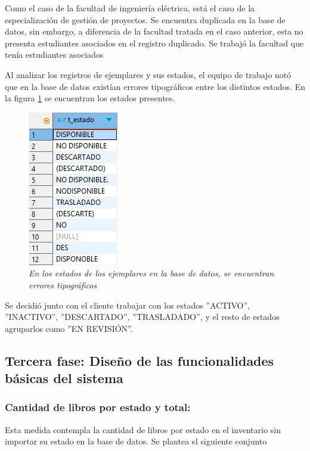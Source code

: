\documentclass[spanish]{ieee_upb}
\begin{document}
\vspace{0.3cm}
Como el caso de la facultad de ingeniería eléctrica, está el caso de la especialización de gestión de proyectos. Se encuentra duplicada en la base de datos, sin embargo, a diferencia de la facultad tratada en el caso anterior, esta no presenta estudiantes asociados en el registro duplicado. Se trabajó la facultad que tenía estudiantes asociados

\vspace{0.3cm}
Al analizar los registros de ejemplares y sus estados, el equipo de trabajo notó que en la base de datos existían errores tipográficos entre los distintos estados. En la figura \ref{fig:problemas-2} se encuentran los estados presentes.

 \begin{figure}[H] 
	\centering
	\includegraphics[width=0.2\linewidth]{img/variedades/bd-problemas2.png}
	\vspace{-1mm}
	\caption[Caso 2: Errores tipográficos en la base de datos]{\textit{En los estados de los ejemplares en la base de datos, se encuentran errores tipográficos}}
	\label{fig:problemas-2} 
\end{figure}

Se decidió junto con el cliente trabajar con los estados ''ACTIVO'', ''INACTIVO'', ''DESCARTADO'', ''TRASLADADO'', y el resto de estados agruparlos como ''EN REVISIÓN''. 


\subsection{Tercera fase: Diseño de las funcionalidades básicas del sistema }

\subsubsection{Cantidad de libros por estado y total: }

Esta medida contempla la cantidad de libros por estado en el inventario sin importar su estado en la base de datos. Se plantea el siguiente conjunto
\end{document}
